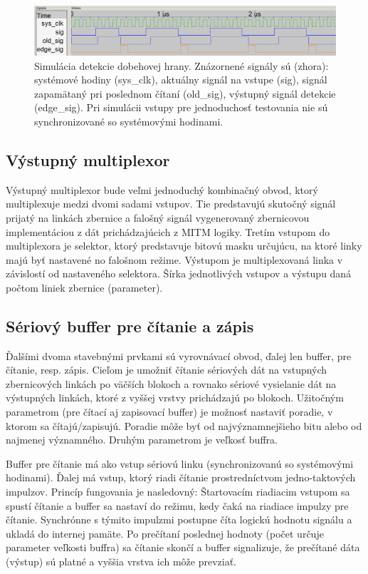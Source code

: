 \begin{figure}
    \centerline{\includegraphics[width=1\textwidth]{images/simulations/edgeDetectSim.png}}
    \caption[Simulácia detekcie dobehovej hrany]{Simulácia detekcie dobehovej hrany. Znázornené signály sú (zhora): systémové hodiny (sys\_clk), aktuálny signál na vstupe (sig), signál zapamätaný pri poslednom čítaní (old\_sig), výstupný signál detekcie (edge\_sig). Pri simulácii vstupy pre jednoduchosť testovania nie sú synchronizované so systémovými hodinami.}
    \label{obr:edgeDetectSim}
\end{figure}

\subsection{Výstupný multiplexor}\label{subsek:multiplexor}
Výstupný multiplexor bude veľmi jednoduchý kombinačný obvod, ktorý multiplexuje medzi dvomi sadami vstupov. Tie predstavujú skutočný signál prijatý na linkách zbernice a falošný signál vygenerovaný zbernicovou implementáciou z dát prichádzajúcich z MITM logiky. Tretím vstupom do multiplexora je selektor, ktorý predstavuje bitovú masku určujúcu, na ktoré linky majú byť nastavené no falošnom režime. Výstupom je multiplexovaná linka v závislostí od nastaveného selektora. Šírka jednotlivých vstupov a výstupu daná počtom liniek zbernice (parameter).

\subsection{Sériový buffer pre čítanie a zápis}
Ďalšími dvoma stavebnými prvkami sú vyrovnávací obvod, ďalej len buffer, pre čítanie, resp. zápis. Cieľom je umožniť čítanie sériových dát na vstupných zbernicových linkách po väčších blokoch a rovnako sériové vysielanie dát na výstupných linkách, ktoré z vyššej vrstvy prichádzajú po blokoch. Užitočným parametrom (pre čítací aj zapisovací buffer) je možnosť nastaviť poradie, v ktorom sa čítajú/zapisujú. Poradie môže byť od najvýznamnejšieho bitu alebo od najmenej významného. Druhým parametrom je veľkosť buffra.

Buffer pre čítanie má ako vstup sériovú linku (synchronizovanú so systémovými hodinami). Ďalej má vstup, ktorý riadi čítanie prostredníctvom jedno-taktových impulzov. Princíp fungovania je nasledovný: Štartovacím riadiacim vstupom sa spustí čítanie a buffer sa nastaví do režimu, kedy čaká na riadiace impulzy pre čítanie. Synchrónne s týmito impulzmi postupne číta logickú hodnotu signálu a ukladá do internej pamäte. Po prečítaní poslednej hodnoty (počet určuje parameter veľkosti buffra) sa čítanie skončí a buffer signalizuje, že prečítané dáta (výstup) sú platné a vyššia vrstva ich môže prevziať.

